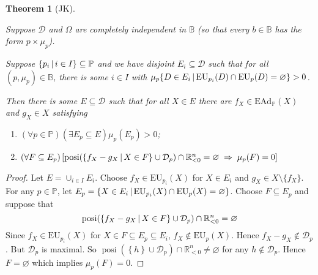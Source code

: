 \documentclass[a4paper]{article}
\newtheorem{theorem}{Theorem}
\DeclareMathOperator{\posi}{posi}
\renewcommand\P{\mathbb{P}} %
\newcommand\EU{\mathrm{EU}}
\newcommand\EAd{\mathrm{EAd}}
\newcommand{\D}{\mathcal{D}}
\newcommand{\Decs}{\mathcal{D}}
\newcommand{\IB}{\mathbb{B}}
\newcommand{\IP}{\P}
\newcommand\SetDelimiter[1][]{
	\nonscript\,#1\vert \allowbreak \nonscript\,\mathopen{}}
\providecommand\given{\SetDelimiter}
\renewcommand{\emptyset}{\varnothing}
\newenvironment{CCM rewritten}
{\begingroup\color{blue}} %
{\endgroup}              %
\begin{document}
\begin{theorem}[JK]\label{thm:moregen1}

Suppose $\D$ and $\Omega$ are completely independent in $\IB$ (so that every $b\in\IB$ has the form $p\times\mu_p$).
	
	Suppose $\{p_i\given i\in I\}\subseteq \IP$ and we have disjoint $E_i\subseteq\Decs$ such that for all $(p,\mu_p)\in\IB$, there is some $i\in I$ with
	 $\mu_p\{D\in E_i\given \EU_{p_i}(D)\cap \EU_p(D)= \emptyset\}>0$.
	
	Then there is some $E\subseteq\Decs$ such that for all $X\in E$ there are $f_X\in\EAd_\IP(X)$ and $g_X\in X$ satisfying
\begin{enumerate}
\item $(\forall p\in\IP)(\exists E_p\subseteq E)\mu_p(E_p)>0$;
\item $(\forall F\subseteq E_p)\left[\posi(\left\{f_X-g_X\given X\in F\right\}\cup\D_p)\cap\mathbb{R}^n_{<0}=\varnothing\;\Rightarrow\;\mu_p(F)=0\right]$
\end{enumerate}

\end{theorem}

\begin{proof}
Let $E=\cup _{i\in I} E_i$. Choose $f_X\in\EU_{p_i}(X)$ for $X\in E_i$ and $g_X\in X\setminus\{f_X\}$. For any $p\in\IP$, let $E_p=\{X\in E_i\given \EU_{p_i}(X)\cap \EU_p(X)= \emptyset\}$. Choose $F\subseteq E_p$ and suppose that 
\[
\posi(\left\{f_X-g_X\given X\in F\right\}\cup\D_p)\cap\mathbb{R}^n_{<0}=\varnothing
\]
Since $f_X\in\EU_{p_i}(X)$ for $X\in F\subseteq E_p\subseteq E_i$, $f_X\notin \EU_p(X)$. Hence $f_X-g_X \notin \D_p$. But $\D_p$ is maximal. So $\posi(\left\{h\right\}\cup\D_p)\cap\mathbb{R}^n_{<0}\not=\varnothing$ for any $h\notin \D_p$. Hence $F=\varnothing$ which implies $\mu_p(F)=0$.



\end{proof}
\end{document}
